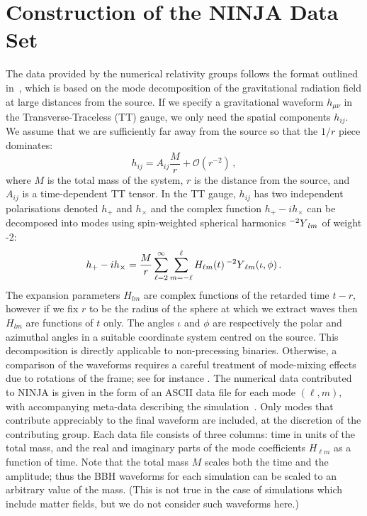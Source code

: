 \fi

\section{Construction of the NINJA Data Set}
\label{sec:ninja1_ninja_data}

The data provided by the numerical relativity groups follows the
format outlined in~\cite{Brown:2007jx}, which is based on the
mode decomposition of the gravitational radiation field at large
distances from the source. If we specify a gravitational
waveform $h_{\mu\nu}$ in the Transverse-Traceless (TT) gauge, we only
need the spatial components $h_{ij}$. We assume that we are
sufficiently far away from the source so that the $1/r$ piece dominates:
\begin{equation}
\label{eq:mode_decomposition}
  h_{ij} = A_{ij}\frac{M}{r} + \mathcal{O}\left(r^{-2}\right)\,,
\end{equation}
where $M$ is the total mass of the system, $r$ is the distance from
the source, and $A_{ij}$ is a time-dependent TT tensor.  In the TT
gauge, $h_{ij}$ has two independent polarisations denoted $h_+$ and
$h_\times$ and the complex function
$h_+-ih_\times$ can be decomposed into modes using spin-weighted spherical
harmonics ${{}^{-2}Y}_{lm}$ of weight -2:
%
\begin{equation}
\label{eq:mode-decomposition}
  h_+ - ih_\times = \frac{M}{r}\sum_{\ell=2}^{\infty}\sum_{m=-\ell}^\ell H_{\ell m}(t)\,
  {{}^{-2}Y}_{\ell m}(\iota,\phi)\,.
\end{equation}
%
The expansion parameters $H_{lm}$ are complex functions of the
retarded time $t-r$, however if we fix $r$ to be the radius of the
sphere at which we extract waves then $H_{lm}$ are functions of $t$
only. The angles $\iota$ and $\phi$ are respectively the polar and
azimuthal angles in a suitable coordinate system centred on the
source. This decomposition is directly applicable to non-precessing
binaries. Otherwise, a comparison of the waveforms requires a careful
treatment of mode-mixing effects due to rotations of the frame; see
for instance \cite{Gualtieri:2008ux}.  The numerical data contributed
to NINJA is given in the form of an ASCII data file for each mode
$(\ell,m)$, with accompanying meta-data describing the
simulation~\cite{Brown:2007jx}. Only modes that contribute appreciably
to the final waveform are included, at the discretion of the
contributing group.  Each data file consists of three columns: time in
units of the total mass, and the real and imaginary parts of the mode
coefficients $H_{\ell m}$ as a function of time. Note that the total
mass $M$ scales both the time and the amplitude; thus the BBH
waveforms for each simulation can be scaled to an arbitrary value of
the mass.  (This is not true in the case of simulations which include
matter fields, but we do not consider such waveforms here.)

